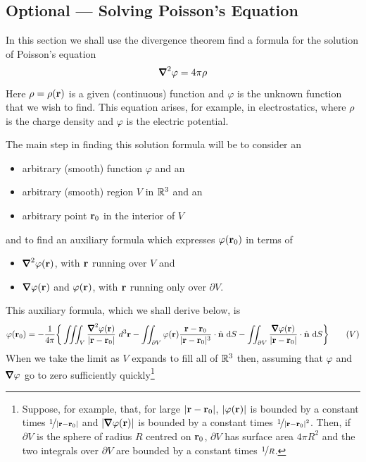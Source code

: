\subsection{Optional --- Solving Poisson's Equation}\label{sec:poisson}

In this section we shall use the divergence theorem find a formula for the solution of Poisson's equation
\begin{equation*}
\vnabla^2\varphi = 4\pi\rho
\end{equation*}
Here $\rho=\rho(\mathbf{r})$ is a given (continuous) function and $\varphi$ 
is the unknown function that we wish to find.
This equation arises, for example, in electrostatics, where $\rho$ is 
the charge density and $\varphi$ is the electric potential. 

The main step in finding this solution formula will be to consider an
\begin{itemize}\itemsep1pt \parskip0pt  \itemindent 15pt
\item[]
arbitrary (smooth) function $\varphi$ and an 
\item[]
arbitrary (smooth) region $V$  in $\mathbb{R}^3$ and an
\item[]
arbitrary point $\mathbf{r}_0$ in the interior of $V$
\end{itemize}
and to find an auxiliary formula which expresses $\varphi(\mathbf{r}_0)$ in terms of 
\begin{itemize}\itemsep1pt \parskip0pt  \itemindent 15pt
\item[]
$\vnabla^2\varphi(\vr)$, with $\mathbf{r}$ running over $V$ and
\item[]
$\vnabla\varphi(\vr)$ and $\varphi(\mathbf{r})$, with $\mathbf{r}$ running only over 
$\partial V$.
\end{itemize}
This auxiliary formula, which we shall derive below, is
\begin{equation}
\varphi(\vr_0)=-\frac{1}{4\pi}\bigg\{
\tripInt_V\frac{ \vnabla^2\varphi(\vr)}{|\vr-\vr_0|}\ d^3\vr
-\dblInt_{\partial V}\varphi(\vr)\frac{\vr-\vr_0}{|\vr-\vr_0|^3}\cdot\hn\ \dee{S}
-\dblInt_{\partial V}\frac{\vnabla\varphi(\vr)}{|\vr-\vr_0|}\cdot\hn\ \dee{S}\bigg\}
\tag{$V$}
\end{equation}
When we take the limit as $V$ expands to fill all of $\mathbb{R}^3$ then,
assuming that $\varphi$ and $\vnabla\varphi$ go to zero sufficiently 
quickly\footnote{Suppose, for example, that, for large $|\mathbf{r}-\mathbf{r}_0|$, 
$|\varphi(\mathbf{r})|$ is bounded by a constant times $\nicefrac{1}{|\mathbf{r}-\mathbf{r}_0|}$
and $|\vnabla\varphi(\vr)|$ is bounded by a constant times 
$\nicefrac{1}{|\mathbf{r}-\mathbf{r}_0|^2}$. Then, if $\partial V$ is the sphere of 
radius $R$ centred on $\mathbf{r}_0$,  $\partial V$ has surface area $4\pi R^2$ 
and the two integrals over $\partial V$ are bounded by a constant times
$\nicefrac{1}{R}$.}
